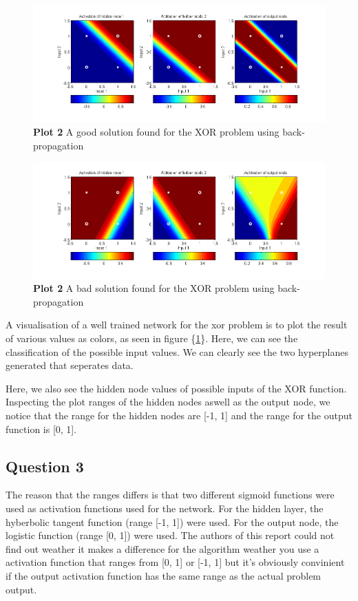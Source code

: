 \documentclass[a4paper]{article}
\begin{document}
\begin{figure}[h!] %
	\caption{\label{fig:good_bprop_xor_plot}\textbf{Plot 2} A good solution found for the XOR problem using back-propagation}
	\includegraphics[scale=0.55]{good_bprop_xor_plot.png}
\end{figure}
\begin{figure}[h!] %
	\caption{\label{fig:bad_bprop_xor_plot}\textbf{Plot 2} A bad solution found for the XOR problem using back-propagation}
	\includegraphics[scale=0.55]{bad_bprop_xor_plot.png}
\end{figure}
A visualisation of a well trained network for the xor problem  
is to plot the result of various values 
as colors, as seen in figure \{\ref{fig:good_bprop_xor_plot}\}. 
Here, we can see the classification of the possible input values. We can 
clearly see the two hyperplanes generated that seperates data. 

Here, we also see the hidden node values of possible inputs of the XOR function.
Inspecting the plot ranges of the hidden nodes aswell as the output node, we notice that
the range for the hidden nodes are [-1, 1] and the range for the output function is [0, 1].
\subsection*{Question 3}
The reason that the ranges differs is that two 
different sigmoid functions were used as activation functions used for the network. 
For the hidden layer, the hyberbolic tangent function (range [-1, 1]) were used. 
For the output node, the logistic function (range [0, 1]) were used. The authors of 
this report could not find out weather it makes a difference for the algorithm weather 
you use a activation function that ranges from [0, 1] or [-1, 1] but it's obviously 
convinient if the output activation function has the same range as the actual problem 
output. 
\end{document}
